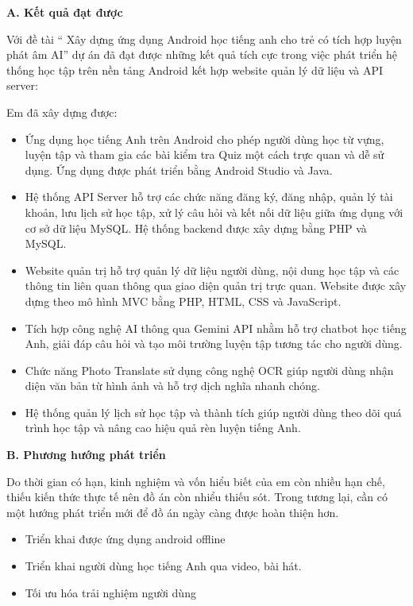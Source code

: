 \noindent\textbf{A. Kết quả đạt được}


Với đề tài `` Xây dựng ứng dụng Android học tiếng anh cho trẻ có tích hợp luyện phát âm AI'' dự án đã đạt được những kết quả tích cực trong việc phát triển hệ thống học tập trên nền tảng Android kết hợp website quản lý dữ liệu và API server:


Em đã xây dựng được:

\begin{itemize}
\item Ứng dụng học tiếng Anh trên Android cho phép người dùng học từ vựng, luyện tập và tham gia các bài kiểm tra Quiz một cách trực quan và dễ sử dụng. Ứng dụng được phát triển bằng Android Studio và Java.
\item Hệ thống API Server hỗ trợ các chức năng đăng ký, đăng nhập, quản lý tài khoản, lưu lịch sử học tập, xử lý câu hỏi và kết nối dữ liệu giữa ứng dụng với cơ sở dữ liệu MySQL. Hệ thống backend được xây dựng bằng PHP và MySQL.
\item Website quản trị hỗ trợ quản lý dữ liệu người dùng, nội dung học tập và các thông tin liên quan thông qua giao diện quản trị trực quan. Website được xây dựng theo mô hình MVC bằng PHP, HTML, CSS và JavaScript.
\item Tích hợp công nghệ AI thông qua Gemini API nhằm hỗ trợ chatbot học tiếng Anh, giải đáp câu hỏi và tạo môi trường luyện tập tương tác cho người dùng.
\item Chức năng Photo Translate sử dụng công nghệ OCR giúp người dùng nhận diện văn bản từ hình ảnh và hỗ trợ dịch nghĩa nhanh chóng.
\item Hệ thống quản lý lịch sử học tập và thành tích giúp người dùng theo dõi quá trình học tập và nâng cao hiệu quả rèn luyện tiếng Anh.
\end{itemize}


\noindent\textbf{B. Phương hướng phát triển}


Do thời gian có hạn, kinh nghiệm và vốn hiểu biết của em còn nhiều hạn chế, thiếu kiến thức thực tế nên đồ án còn nhiểu thiếu sót. Trong tương lại, cần có một hướng phát triển mới để đồ án ngày càng được hoàn thiện hơn.


\begin{itemize}
\item Triển khai được ứng dụng android offline
\item Triển khai người dùng học tiếng Anh qua video, bài hát.
\item Tối ưu hóa trải nghiệm người dùng
\end{itemize}
